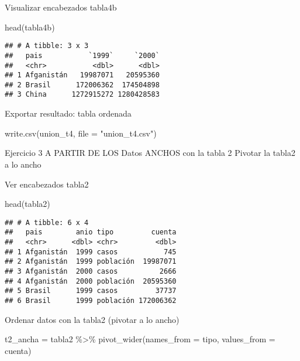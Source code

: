 \documentclass[
]{article}
\newenvironment{Shaded}{\begin{snugshade}}{\end{snugshade}}
\newcommand{\AttributeTok}[1]{\textcolor[rgb]{0.77,0.63,0.00}{#1}}
\newcommand{\FunctionTok}[1]{\textcolor[rgb]{0.00,0.00,0.00}{#1}}
\newcommand{\NormalTok}[1]{#1}
\newcommand{\OtherTok}[1]{\textcolor[rgb]{0.56,0.35,0.01}{#1}}
\newcommand{\SpecialCharTok}[1]{\textcolor[rgb]{0.00,0.00,0.00}{#1}}
\newcommand{\StringTok}[1]{\textcolor[rgb]{0.31,0.60,0.02}{#1}}
\begin{document}
Visualizar encabezados tabla4b

\begin{Shaded}
\begin{Highlighting}[]
\FunctionTok{head}\NormalTok{(tabla4b)}
\end{Highlighting}
\end{Shaded}

\begin{verbatim}
## # A tibble: 3 x 3
##   pais           `1999`     `2000`
##   <chr>           <dbl>      <dbl>
## 1 Afganistán   19987071   20595360
## 2 Brasil      172006362  174504898
## 3 China      1272915272 1280428583
\end{verbatim}

Exportar resultado: tabla ordenada

\begin{Shaded}
\begin{Highlighting}[]
\FunctionTok{write.csv}\NormalTok{(union\_t4, }\AttributeTok{file =} \StringTok{"union\_t4.csv"}\NormalTok{)}
\end{Highlighting}
\end{Shaded}

Ejercicio 3 A PARTIR DE LOS Datos ANCHOS con la tabla 2 Pivotar la
tabla2 a lo ancho

Ver encabezados tabla2

\begin{Shaded}
\begin{Highlighting}[]
\FunctionTok{head}\NormalTok{(tabla2)}
\end{Highlighting}
\end{Shaded}

\begin{verbatim}
## # A tibble: 6 x 4
##   pais        anio tipo         cuenta
##   <chr>      <dbl> <chr>         <dbl>
## 1 Afganistán  1999 casos           745
## 2 Afganistán  1999 población  19987071
## 3 Afganistán  2000 casos          2666
## 4 Afganistán  2000 población  20595360
## 5 Brasil      1999 casos         37737
## 6 Brasil      1999 población 172006362
\end{verbatim}

Ordenar datos con la tabla2 (pivotar a lo ancho)

\begin{Shaded}
\begin{Highlighting}[]
\NormalTok{t2\_ancha }\OtherTok{=}\NormalTok{ tabla2 }\SpecialCharTok{\%\textgreater{}\%} 
  \FunctionTok{pivot\_wider}\NormalTok{(}\AttributeTok{names\_from =}\NormalTok{ tipo, }\AttributeTok{values\_from =}\NormalTok{ cuenta)}
\end{Highlighting}
\end{Shaded}
\end{document}
